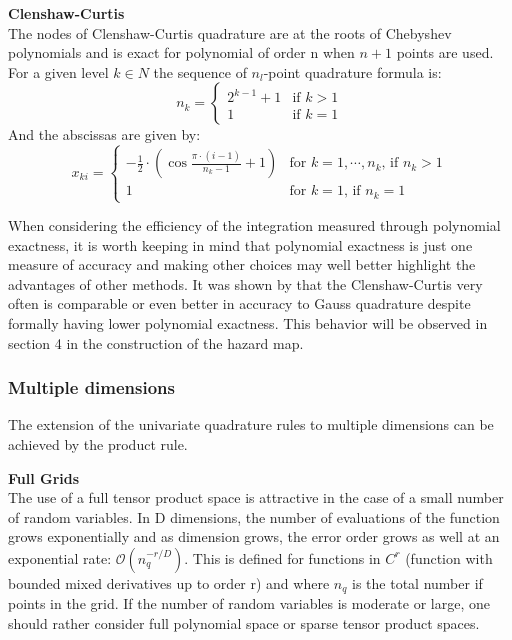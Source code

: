 \documentclass{article}
\begin{document}
\textbf{Clenshaw-Curtis}\\
The nodes of Clenshaw-Curtis quadrature are at the roots of Chebyshev polynomials and
is exact for polynomial of order n when $n+1$ points are used.
For a given level $k \in N$ the sequence of $n_l$-point quadrature formula is:
\begin{equation}
n_k= \left \{ \begin{array}{ll}
                    2^{k-1} + 1 & \mbox{if $k>1$}\\
                    1 &\mbox{if $k=1$}
              \end{array}
              \right.
\end{equation}
And the abscissas are given by:
\begin{equation}
x_{ki}= \left \{ \begin{array}{ll}
                   -\frac{1}{2}\cdot(\cos\frac{\pi \cdot (i-1)}{n_k-1}+1) & \mbox{for $k=1,\cdots,n_k$, if $n_k >1$}\\
                    1 &\mbox{for $k=1$, if $n_k=1$}
              \end{array}
              \right.
\end{equation}

When considering the efficiency of the integration measured through polynomial exactness, it is
worth keeping in mind that polynomial exactness is just one measure of accuracy and making
other choices may well better highlight the advantages of other methods. It was shown by 
that the Clenshaw-Curtis very often is comparable or even better in accuracy to Gauss
quadrature despite formally having lower polynomial exactness. This behavior will be observed 
in section 4 in the construction of the hazard map.

\subsubsection{Multiple dimensions}
The extension of the univariate quadrature rules to multiple dimensions can be achieved by 
the product rule. 

\textbf{Full Grids}\\
 The use of a full tensor product space is attractive in the case of a small number of random variables.
 In D dimensions, the number of evaluations of the function grows exponentially and as dimension
 grows, the error order grows as well at an exponential rate: $\mathcal{O}(n_{q}^{-r/D})$.
 This is defined for functions in $C^r$ (function with bounded mixed derivatives up to order r)
 and where $n_q$ is the total number if points in the grid.
 If the number of random variables is moderate or large, one should rather consider full polynomial 
 space or sparse tensor product spaces. 
\end{document}
